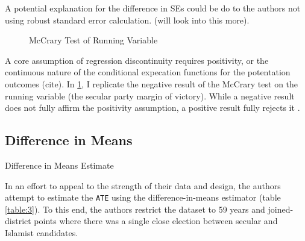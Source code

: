 \documentclass{scrartcl}
\begin{document}
A potential explanation for the difference in SEs could be do to the authors not using robust standard error calculation. (will look into this more).


\begin{figure}[h]
  \centering
  \caption{McCrary Test of Running Variable}
  \label{fig:mccrary-test}
\end{figure}

A core assumption of regression discontinuity requires positivity, or the continuous nature of the conditional expecation functions for the potentation outcomes (cite).
In \ref{fig:mccrary-test}, I replicate the negative result of the McCrary test on the running variable (the secular party margin of victory).
While a negative result does not fully affirm the positivity assumption, a positive result fully rejects it \cite{mccrary:2008}.



\subsection{Difference in Means}

\begin{table}[ht]
  \begin{center}
    \scalebox{0.75}{
      
    }
    \caption{Difference in Means Estimate}
    \label{table:3}
  \end{center}
\end{table}

In an effort to appeal to the strength of their data and design, the authors attempt to estimate the \texttt{ATE} using the difference-in-means estimator (table \ref{table:3}).
To this end, the authors restrict the dataset to 59 years and joined-district points where there was a single close election between secular and Islamist candidates.
\end{document}

